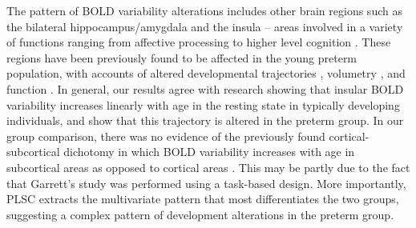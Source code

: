 The pattern of BOLD variability alterations includes other brain regions such as the bilateral hippocampus/amygdala and the insula – areas involved in a variety of functions ranging from affective processing to higher level cognition \citep{Uddin2018}. These regions have been previously found to be affected in the young preterm population, with accounts of altered developmental trajectories \citep{Thompson2014}, volumetry \citep{Chau2019}, and function \citep{Nosarti2006}. In general, our results agree with research showing that insular BOLD variability increases linearly with age in the resting state \citep{Nomi2018} in typically developing individuals, and show that this trajectory is altered in the preterm group. In our group comparison, there was no evidence of the previously found cortical-subcortical dichotomy in which BOLD variability increases with age in subcortical areas as opposed to cortical areas \citep{Garrett2013b}. This may be partly due to the fact that Garrett's study was performed using a task-based design. More importantly, PLSC extracts the multivariate pattern that most differentiates the two groups, suggesting a complex pattern of development alterations in the preterm group.


